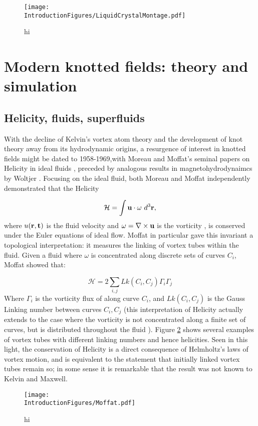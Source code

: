 \begin{figure}[htbp]
\centering
\texttt{[image: \\IntroductionFigures/LiquidCrystalMontage.pdf]}
\caption{hi }
\label{fig:KnottedLiquidCrystal}
\end{figure}

\section{Modern knotted fields: theory and simulation}
\subsection{Helicity, fluids, superfluids}
With the decline of Kelvin's vortex atom theory and the development of knot theory away from its hydrodynamic origins, a resurgence of interest in knotted fields might be dated to 1958-1969,with Moreau and Moffat's seminal papers on Helicity in ideal fluids \cite{Moreau,Moffat}, preceded by analogous results in magnetohydrodynaimcs by Woltjer \cite{Woltjer}. Focusing on the ideal fluid, both Moreau and Moffat independently demonstrated that the Helicity

\begin{equation}
    \mathcal{H} = \int {\bf u} \cdot {\bf \omega} \ d^3 \bf r,
\end{equation}
where $u(\bf r,t)$ is the fluid velocity and $\omega = \nabla \times \bf u$ is the vorticity \cite{Saffman}, is conserved under the Euler equations of ideal flow. Moffat in particular gave this invariant a topological interpretation: it measures the linking of vortex tubes within the fluid. Given a fluid where $\omega$ is concentrated along discrete sets of curves $C_i$, Moffat showed that:

\begin{equation}
    \mathcal{H} = 2 \sum_{i,j} Lk(C_i,C_j) \Gamma_i \Gamma_j 
\end{equation}
Where $\Gamma_i$ is the vorticity flux of along curve $C_i$, and $Lk(C_i,C_j)$ is the Gauss Linking number between curves $C_i, C_j$ (this interpretation of Helicity actually extends to the case where the vorticity is not concentrated along a finite set of curves, but is distributed throughout the fluid \cite{Arnold,Berger,Berger}). Figure \ref{fig:Moffat} shows several examples of vortex tubes with different linking numbers and hence helicities. Seen in this light, the conservation of Helicity is a direct consequence of Helmholtz's laws of vortex motion, and is equivalent to the statement that initially linked vortex tubes remain so; in some sense it is remarkable that the result was not known to Kelvin and Maxwell.
\begin{figure}[htbp]
\centering
\texttt{[image: \\IntroductionFigures/Moffat.pdf]}
\caption{hi }
\label{fig:Moffat}
\end{figure}

